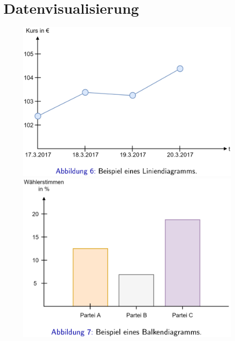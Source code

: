 \documentclass{report}
\begin{document}
  \section{Datenvisualisierung}	
  \begin{figure}[H]	
    \centering	
    \begin{minipage}[b]{0.4\textwidth}	
      \includegraphics[scale=.25]{ml01_4}	
    \end{minipage}	
    \hfill	
    \begin{minipage}[b]{0.4\textwidth}	
      \includegraphics[scale=.25]{ml01_5}	
    \end{minipage}	
  \end{figure}	
\end{document}
